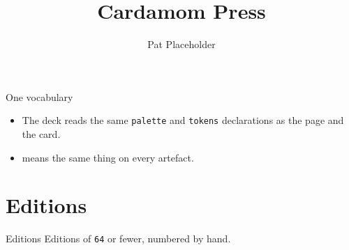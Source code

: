 \documentclass[aspectratio=169]{slides}
\title{Cardamom Press}
\author{Pat Placeholder}
\date{}
\begin{document}
\maketitle

\begin{frame}{One vocabulary}
  \begin{itemize}
    \item The deck reads the same \texttt{palette} and \texttt{tokens}
      declarations as the page and the card.
    \item {} means the same thing on every artefact.
  \end{itemize}
\end{frame}

\section{Editions}

\begin{frame}{Editions}
  Editions of \texttt{64} or fewer, numbered by hand.
\end{frame}
\end{document}
